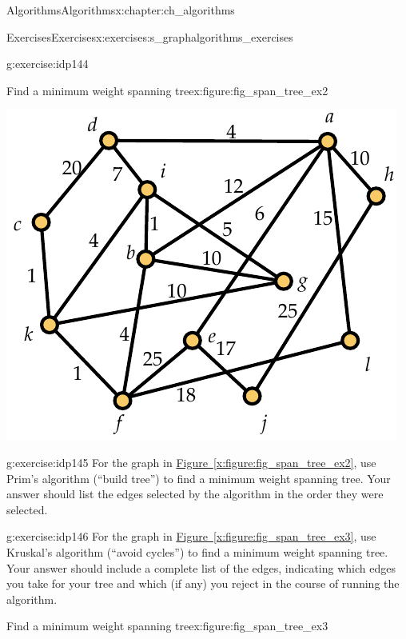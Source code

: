\documentclass[oneside,10pt,]{book}
\newcommand{\xreffont}{\relax}
\numberwithin{equation}{section}
\begin{document}
\begin{chapterptx}{Algorithms}{}{Algorithms}{}{}{x:chapter:ch_algorithms}
\begin{exercises-section}{Exercises}{}{Exercises}{}{}{x:exercises:s_graphalgorithms_exercises}
\begin{divisionexercise}{3}{}{}{g:exercise:idp144}
\begin{figureptx}{Find a minimum weight spanning tree}{x:figure:fig_span_tree_ex2}{}
\begin{image}{0.175}{0.65}{0.175}
\includegraphics[width=\linewidth]{images/span_tree_ex2}
\end{image}%
\tcblower
\end{figureptx}%
\end{divisionexercise}%
\begin{divisionexercise}{4}{}{}{g:exercise:idp145}%
For the graph in \hyperref[x:figure:fig_span_tree_ex2]{Figure~{\xreffont\ref{x:figure:fig_span_tree_ex2}}}, use Prim's algorithm (``build tree'') to find a minimum weight spanning tree. Your answer should list the edges selected by the algorithm in the order they were selected.%
\end{divisionexercise}%
\begin{divisionexercise}{5}{}{}{g:exercise:idp146}%
For the graph in \hyperref[x:figure:fig_span_tree_ex3]{Figure~{\xreffont\ref{x:figure:fig_span_tree_ex3}}}, use Kruskal's algorithm (``avoid cycles'') to find a minimum weight spanning tree. Your answer should include a complete list of the edges, indicating which edges you take for your tree and which (if any) you reject in the course of running the algorithm.%
\begin{figureptx}{Find a minimum weight spanning tree}{x:figure:fig_span_tree_ex3}{}%
\begin{image}{0.275}{0.45}{0.275}%

\end{image}
\end{figureptx}
\end{divisionexercise}
\end{exercises-section}
\end{chapterptx}
\end{document}
